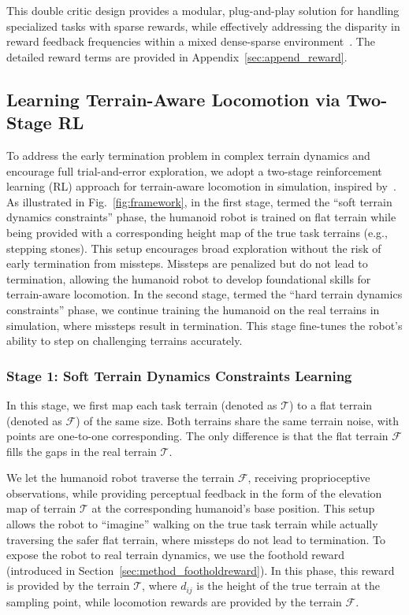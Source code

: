 This double critic design provides a modular, plug-and-play solution for handling specialized tasks with sparse rewards, while effectively addressing the disparity in reward feedback frequencies within a mixed dense-sparse environment~\cite{zargarbashi2024robotkeyframing}. The detailed reward terms are provided in Appendix~\ref{sec:append_reward}.

\subsection{Learning Terrain-Aware Locomotion via Two-Stage RL}
\label{sec:method_twostage}

To address the early termination problem in complex terrain dynamics and encourage full trial-and-error exploration, we adopt a two-stage reinforcement learning (RL) approach for terrain-aware locomotion in simulation, inspired by~\cite{zhuang2023robot, zhuang2024humanoid}. As illustrated in Fig.~\ref{fig:framework}, in the first stage, termed the ``soft terrain dynamics constraints'' phase, the humanoid robot is trained on flat terrain while being provided with a corresponding height map of the true task terrains (e.g., stepping stones). This setup encourages broad exploration without the risk of early termination from missteps. Missteps are penalized but do not lead to termination, allowing the humanoid robot to develop foundational skills for terrain-aware locomotion. In the second stage, termed the ``hard terrain dynamics constraints'' phase, we continue training the humanoid on the real terrains in simulation, where missteps result in termination. This stage fine-tunes the robot's ability to step on challenging terrains accurately.

\subsubsection{Stage 1: Soft Terrain Dynamics Constraints Learning}

In this stage, we first map each task terrain (denoted as $\mathcal{T}$) to a flat terrain (denoted as $\mathcal{F}$) of the same size. Both terrains share the same terrain noise, with points are one-to-one corresponding. The only difference is that the flat terrain $\mathcal{F}$ fills the gaps in the real terrain $\mathcal{T}$. 

We let the humanoid robot traverse the terrain $\mathcal{F}$, receiving proprioceptive observations, while providing perceptual feedback in the form of the elevation map of terrain $\mathcal{T}$ at the corresponding humanoid's base position. This setup allows the robot to ``imagine'' walking on the true task terrain while actually traversing the safer flat terrain, where missteps do not lead to termination. To expose the robot to real terrain dynamics, we use the foothold reward (introduced in Section~\ref{sec:method_footholdreward}). In this phase, this reward is provided by the terrain $\mathcal{T}$, where $d_{ij}$ is the height of the true terrain at the sampling point, while locomotion rewards are provided by the terrain $\mathcal{F}$. 

